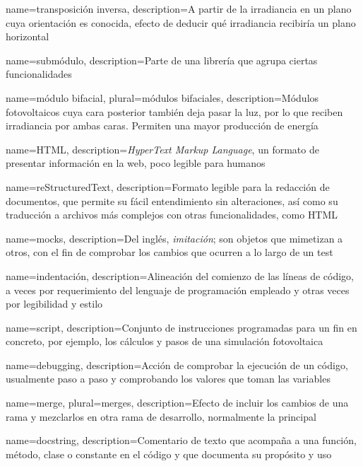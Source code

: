 {
    name={transposición inversa},
    description={A partir de la irradiancia en un plano cuya orientación es conocida, efecto de deducir qué irradiancia recibiría un plano horizontal}
}

{
    name={submódulo},
    description={Parte de una \gls{librería} que agrupa ciertas funcionalidades}
}

{
    name={módulo bifacial},
    plural={módulos bifaciales},
    description={Módulos fotovoltaicos cuya cara posterior también deja pasar la luz, por lo que reciben irradiancia por ambas caras. Permiten una mayor producción de energía}
}

{
    name={HTML},
    description={\textit{HyperText Markup Language}, un formato de presentar información en la web, poco legible para humanos}
}

{
    name={reStructuredText},
    description={Formato legible para la redacción de documentos, que permite su fácil entendimiento sin alteraciones, así como su traducción a archivos más complejos con otras funcionalidades, como \gls{HTML}}
}

{
    name={mocks},
    description={Del inglés, \textit{imitación}; son objetos que mimetizan a otros, con el fin de comprobar los cambios que ocurren a lo largo de un test}
}

{
    name={indentación},
    description={Alineación del comienzo de las líneas de código, a veces por requerimiento del lenguaje de programación empleado y otras veces por legibilidad y estilo}
}

{
    name={script},
    description={Conjunto de instrucciones programadas para un fin en concreto, por ejemplo, los cálculos y pasos de una simulación fotovoltaica}
}

{
    name={debugging},
    description={Acción de comprobar la ejecución de un código, usualmente paso a paso y comprobando los valores que toman las variables}
}

{
    name={merge},
    plural={merges},
    description={Efecto de incluir los cambios de una \gls{rama} y mezclarlos en otra rama de desarrollo, normalmente la principal}
}

{
    name={docstring},
    description={Comentario de texto que acompaña a una función, método, clase o constante en el código y que documenta su propósito y uso}
}

